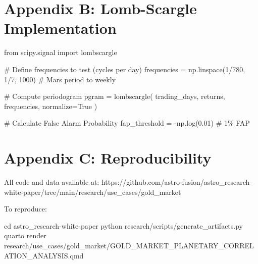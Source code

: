 \documentclass[
  11pt,
  a4paper,
  oneside,
  openany]{article}
\newenvironment{Shaded}{\begin{snugshade}}{\end{snugshade}}
\newcommand{\BuiltInTok}[1]{\textcolor[rgb]{0.00,0.23,0.31}{#1}}
\newcommand{\CommentTok}[1]{\textcolor[rgb]{0.37,0.37,0.37}{#1}}
\newcommand{\DecValTok}[1]{\textcolor[rgb]{0.68,0.00,0.00}{#1}}
\newcommand{\ExtensionTok}[1]{\textcolor[rgb]{0.00,0.23,0.31}{#1}}
\newcommand{\FloatTok}[1]{\textcolor[rgb]{0.68,0.00,0.00}{#1}}
\newcommand{\ImportTok}[1]{\textcolor[rgb]{0.00,0.46,0.62}{#1}}
\newcommand{\NormalTok}[1]{\textcolor[rgb]{0.00,0.23,0.31}{#1}}
\newcommand{\OperatorTok}[1]{\textcolor[rgb]{0.37,0.37,0.37}{#1}}
\newcommand{\VariableTok}[1]{\textcolor[rgb]{0.07,0.07,0.07}{#1}}
\begin{document}
\section{Appendix B: Lomb-Scargle
Implementation}\label{appendix-b-lomb-scargle-implementation}

\begin{Shaded}
\begin{Highlighting}[]
\ImportTok{from}\NormalTok{ scipy.signal }\ImportTok{import}\NormalTok{ lombscargle}

\CommentTok{\# Define frequencies to test (cycles per day)}
\NormalTok{frequencies }\OperatorTok{=}\NormalTok{ np.linspace(}\DecValTok{1}\OperatorTok{/}\DecValTok{780}\NormalTok{, }\DecValTok{1}\OperatorTok{/}\DecValTok{7}\NormalTok{, }\DecValTok{1000}\NormalTok{)  }\CommentTok{\# Mars period to weekly}

\CommentTok{\# Compute periodogram}
\NormalTok{pgram }\OperatorTok{=}\NormalTok{ lombscargle(}
\NormalTok{    trading\_days,}
\NormalTok{    returns,}
\NormalTok{    frequencies,}
\NormalTok{    normalize}\OperatorTok{=}\VariableTok{True}
\NormalTok{)}

\CommentTok{\# Calculate False Alarm Probability}
\NormalTok{fap\_threshold }\OperatorTok{=} \OperatorTok{{-}}\NormalTok{np.log(}\FloatTok{0.01}\NormalTok{)  }\CommentTok{\# 1\% FAP}
\end{Highlighting}
\end{Shaded}

\section{Appendix C: Reproducibility}\label{appendix-c-reproducibility}

All code and data available at:
https://github.com/astro-fusion/astro\_research-white-paper/tree/main/research/use\_cases/gold\_market

To reproduce:

\begin{Shaded}
\begin{Highlighting}[]
\BuiltInTok{cd}\NormalTok{ astro\_research{-}white{-}paper}
\ExtensionTok{python}\NormalTok{ research/scripts/generate\_artifacts.py}
\ExtensionTok{quarto}\NormalTok{ render research/use\_cases/gold\_market/GOLD\_MARKET\_PLANETARY\_CORRELATION\_ANALYSIS.qmd}
\end{Highlighting}
\end{Shaded}
\end{document}
